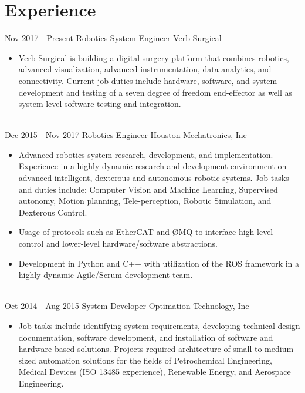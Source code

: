 \documentclass[letterpaper]{twentysecondcv} %
\begin{document}
\makeprofile %


\section{Experience}

\begin{twenty} %
	\twentyitem
	{Nov 2017 -}
	{Present}
	{Robotics System Engineer}
	{\href{http://verbsurgical.com/}{Verb Surgical}}
	{}
	{\begin{itemize}
			\item Verb Surgical is building a digital surgery platform that combines robotics, advanced visualization, advanced instrumentation, data analytics, and connectivity. 
			Current job duties include hardware, software, and system development and testing of a seven degree of freedom end-effector as well as system level software testing and integration. 
		\end{itemize}}
		\\
		\twentyitem
		{Dec 2015 -}
		{Nov 2017}
		{Robotics Engineer}
		{\href{https://houstonmechatronics.com/}{Houston Mechatronics, Inc}}
		{}
		{
			{\begin{itemize}
					\item Advanced robotics system research, development, and implementation. Experience in a highly dynamic research and development environment on advanced intelligent, dexterous and autonomous robotic systems. Job tasks and duties include: Computer Vision and Machine Learning, Supervised autonomy, Motion planning, Tele-perception, Robotic Simulation, and Dexterous Control. 
					\item Usage of protocols such as EtherCAT and ØMQ to interface high level control and lower-level hardware/software abstractions. 
					\item Development in Python and C++ with utilization of the ROS framework in a highly dynamic Agile/Scrum development team.
				\end{itemize}}
			}
			\\   
			\twentyitem
			{Oct 2014 -}
			{Aug 2015}
			{System Developer}
			{\href{http://optimation.us/}{Optimation Technology, Inc}}
			{}
			{
				{\begin{itemize}
						\item Job tasks include identifying system requirements, developing technical design documentation, software development, and installation of software and hardware based solutions. Projects required architecture of small to medium sized automation solutions for the fields of Petrochemical Engineering, Medical Devices (ISO 13485 experience), Renewable Energy, and Aerospace Engineering.

\end{itemize}}}
\end{twenty}
\end{document}
